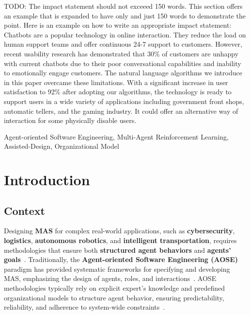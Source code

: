 \documentclass[journal]{IEEEtai}
\begin{document}
\begin{IEEEImpStatement}
TODO: The impact statement should not exceeed 150 words. This section offers an example that is expanded to have only and just 150 words to demonstrate the point. Here is an example on how to write an appropriate impact statement: Chatbots are a popular technology in online interaction. They reduce the load on human support teams and offer continuous 24-7 support to customers. However, recent usability research has demonstrated that 30\% of customers are unhappy with current chatbots due to their poor conversational capabilities and inability to emotionally engage customers. The natural language algorithms we introduce in this paper overcame these limitations. With a significant increase in user satisfaction to 92\% after adopting our algorithms, the technology is ready to support users in a wide variety of applications including government front shops, automatic tellers, and the gaming industry. It could offer an alternative way of interaction for some physically disable users.
\end{IEEEImpStatement}

\begin{IEEEkeywords}
Agent-oriented Software Engineering, Multi-Agent Reinforcement Learning, Assisted-Design, Organizational Model
\end{IEEEkeywords}



\section{Introduction}

\subsection{Context}

Designing \textbf{MAS} for complex real-world applications, such as \textbf{cybersecurity}, \textbf{logistics}, \textbf{autonomous robotics}, and \textbf{intelligent transportation}, requires methodologies that ensure both \textbf{structured agent behaviors} and \textbf{agents' goals}~\cite{Jamont2O15}. Traditionally, the \textbf{Agent-oriented Software Engineering (AOSE)} paradigm has provided systematic frameworks for specifying and developing MAS, emphasizing the design of agents, roles, and interactions~\cite{Pavon2003, Bernon2005}. AOSE methodologies typically rely on explicit expert's knowledge and predefined organizational models to structure agent behavior, ensuring predictability, reliability, and adherence to system-wide constraints~\cite{Hindriks2014}.
\end{document}
